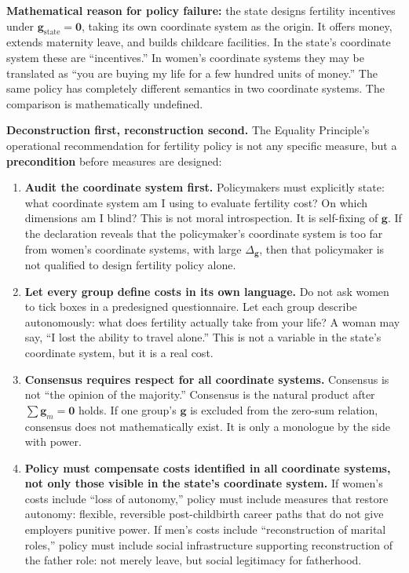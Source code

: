 \documentclass[12pt,a4paper]{article}
\theoremstyle{remark}
\begin{document}
\textbf{Mathematical reason for policy failure:} the state designs fertility incentives under $\mathbf{g}_{\text{state}} = \mathbf{0}$, taking its own coordinate system as the origin. It offers money, extends maternity leave, and builds childcare facilities. In the state's coordinate system these are ``incentives.'' In women's coordinate systems they may be translated as ``you are buying my life for a few hundred units of money.'' The same policy has completely different semantics in two coordinate systems. The comparison is mathematically undefined.

\textbf{Deconstruction first, reconstruction second.} The Equality Principle's operational recommendation for fertility policy is not any specific measure, but a \textbf{precondition} before measures are designed:

\begin{enumerate}[label=(\arabic*)]
    \item \textbf{Audit the coordinate system first.} Policymakers must explicitly state: what coordinate system am I using to evaluate fertility cost? On which dimensions am I blind? This is not moral introspection. It is self-fixing of $\mathbf{g}$. If the declaration reveals that the policymaker's coordinate system is too far from women's coordinate systems, with large $\Delta_{\mathbf{g}}$, then that policymaker is not qualified to design fertility policy alone.
    \item \textbf{Let every group define costs in its own language.} Do not ask women to tick boxes in a predesigned questionnaire. Let each group describe autonomously: what does fertility actually take from your life? A woman may say, ``I lost the ability to travel alone.'' This is not a variable in the state's coordinate system, but it is a real cost.
    \item \textbf{Consensus requires respect for all coordinate systems.} Consensus is not ``the opinion of the majority.'' Consensus is the natural product after $\sum\mathbf{g}_m = \mathbf{0}$ holds. If one group's $\mathbf{g}$ is excluded from the zero-sum relation, consensus does not mathematically exist. It is only a monologue by the side with power.
    \item \textbf{Policy must compensate costs identified in all coordinate systems, not only those visible in the state's coordinate system.} If women's costs include ``loss of autonomy,'' policy must include measures that restore autonomy: flexible, reversible post-childbirth career paths that do not give employers punitive power. If men's costs include ``reconstruction of marital roles,'' policy must include social infrastructure supporting reconstruction of the father role: not merely leave, but social legitimacy for fatherhood.
\end{enumerate}
\end{document}
